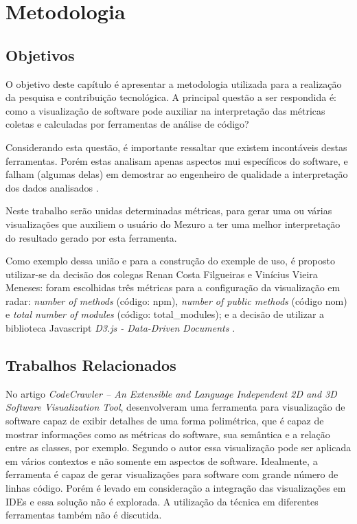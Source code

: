 \chapter{Metodologia}

\section{Objetivos}

O objetivo deste capítulo é apresentar a metodologia utilizada para a
realização da pesquisa e contribuição tecnológica. A principal questão
a ser respondida é: como a visualização de software pode auxiliar na
interpretação das métricas coletas e calculadas por ferramentas de análise
de código?

Considerando esta questão, é importante ressaltar que existem incontáveis
destas ferramentas. Porém estas analisam apenas aspectos mui específicos
do software, e falham (algumas delas) em demostrar ao engenheiro de
qualidade a interpretação dos dados analisados \cite{deissenboeck2011quamoco}.

Neste trabalho serão unidas determinadas métricas, para gerar uma ou várias
visualizações que auxiliem o usuário do Mezuro a ter uma melhor interpretação do
resultado gerado por esta
ferramenta.

Como exemplo dessa união e para a construção do exemple de uso, é proposto
utilizar-se da decisão dos colegas Renan Costa Filgueiras e Vinícius Vieira
Meneses: foram escolhidas três métricas para a configuração da visualização em
radar: \textit{number of methods} (código: npm), \textit{number of public
methods} (código nom) e \textit{total number of modules} (código:
total\_modules); e a decisão de utilizar a biblioteca Javascript \textit{D3.js -
Data-Driven Documents} \cite{filgueiras2014mezuro}.

\section{Trabalhos Relacionados}

No artigo \textit{CodeCrawler – An Extensible and Language Independent 2D and
3D Software Visualization Tool}, 
desenvolveram uma ferramenta para visualização de software capaz de exibir
detalhes de uma forma polimétrica, que é capaz de mostrar informações como as
métricas do software, sua semântica e a relação entre as classes, por exemplo.
Segundo o autor essa visualização pode ser aplicada em vários contextos e não
somente em aspectos de software. Idealmente, a ferramenta é capaz de gerar
visualizações para software com grande número de linhas código. Porém é levado
em consideração a integração das visualizações em IDEs e essa solução não é
explorada. A utilização da técnica em diferentes ferramentas também não é
discutida.

